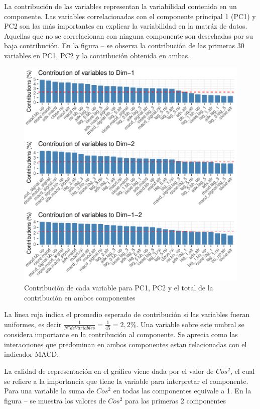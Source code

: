 \documentclass[a4paper,12pt]{Latex/Classes/PhDthesisPSnPDF}
\begin{document}
La contribución de las variables representan la variabilidad contenida en un componente. Las variables correlacionadas con el componente principal 1 (PC1) y PC2 son las más importantes en explicar la variabilidad en la matráz de datos. Aquellas que no se correlacionan con ninguna componente son desechadas por su baja contribución. En la figura -- se observa la contribución de las primeras 30 variables en PC1, PC2 y la contribución obtenida en ambas.

\begin{figure}[H]
\centering
\includegraphics{main-009}
\caption{Contribución de cada variable para PC1, PC2 y el total de la contribución en ambos componentes}
\end{figure}

La línea roja indica el promedio esperado de contribución si las variables fueran uniformes, es decir $ \frac{1}{N° de Variables} = \frac{1}{45} = 2,2\%$. Una variable sobre este umbral se considera importante en la contribución al componente. Se aprecia como las interacciones que predominan en ambos componentes estan relacionadas con el indicador MACD.

La calidad de representación en el gráfico viene dada por el valor de $Cos^2$, el cual se refiere a la importancia que tiene la variable para interpretar el componente. Para una variable la suma de $Cos^2$ en todas las componentes equivale a 1. En la figura -- se muestra los valores de $Cos^2$ para las primeras 2 componentes
\end{document}
